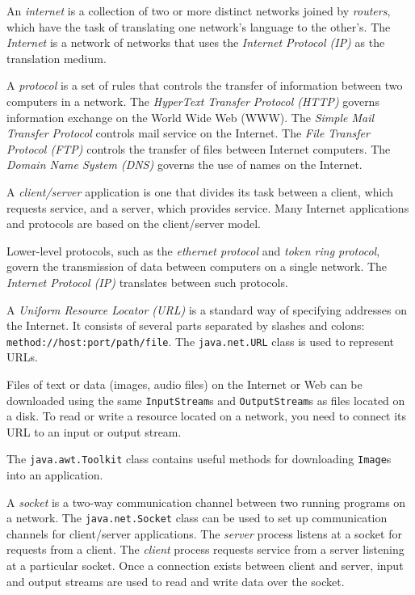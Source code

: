 \begin{SMBL}
\item  An {\it internet} is a collection of two or more distinct networks
joined by {\it routers}, which have the task of translating one
network's language to the other's.  The {\it Internet} is a network of networks
that uses the {\it Internet Protocol (IP)} as the translation medium.

\item  A {\it protocol} is a set of rules that controls the transfer
of information between two computers in a network.  The {\it HyperText
Transfer Protocol (HTTP)} governs information exchange on the World
Wide Web (WWW). The {\it Simple Mail Transfer Protocol} controls mail
service on the Internet.  The {\it File Transfer Protocol (FTP)}
controls the transfer of files between Internet computers.  The {\it
Domain Name System (DNS)} governs the use of names on the Internet.

\item  A {\it client/server} application is one that divides
its task between a client, which requests service, and a
server, which provides service.  Many Internet applications
and protocols are based on the client/server model.

\item  Lower-level protocols, such as the {\it ethernet protocol}
and {\it token ring protocol}, govern the transmission of data between
computers on a single network.  The {\it Internet Protocol (IP)}
translates between such protocols.

\item   A {\it Uniform Resource Locator (URL)} is a standard way of
specifying addresses on the Internet.  It consists of several parts
separated by slashes and colons: {\tt method://host:port/path/file}.
The {\tt java.net.URL} class is used to represent URLs.

\item  Files of text or data (images, audio files) on the Internet
or Web can be downloaded using the same {\tt InputStream}s and
{\tt OutputStream}s as files located on a disk.  To read or write
a resource located on a network, you need to connect its URL to
an input or output stream.

\item  The {\tt java.awt.Toolkit} class contains useful methods
for downloading {\tt Image}s into an application.

\item  A {\it socket} is a two-way communication channel between
two running programs on a network.  The {\tt java.net.Socket}
class can be used to set up communication channels for
client/server applications.  The {\it server} process
listens at a socket for requests from a client.  The {\it client}
process requests service from a server listening at a particular
socket.  Once a connection exists between client and server,
input and output streams are used to read and write data over
the socket.
\end{SMBL}

